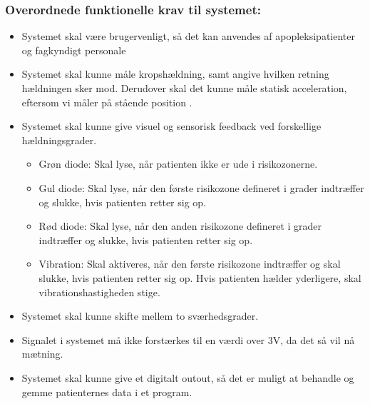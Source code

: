\subsubsection{Overordnede funktionelle krav til systemet:}
\begin{itemize}
\item Systemet skal være brugervenligt, så det kan anvendes af apopleksipatienter og fagkyndigt personale
\item Systemet skal kunne måle kropshældning, samt angive hvilken retning hældningen sker mod. Derudover skal det kunne måle statisk acceleration, eftersom vi måler på stående position .
\item Systemet skal kunne give visuel og sensorisk feedback ved forskellige hældningsgrader.
\begin{itemize}
\item Grøn diode: Skal lyse, når patienten ikke er ude i risikozonerne.  
\item Gul diode: Skal lyse, når den første risikozone defineret i grader indtræffer og slukke, hvis patienten retter sig op.
\item Rød diode: Skal lyse, når den anden risikozone defineret i grader indtræffer og slukke, hvis patienten retter sig op.
\item Vibration: Skal aktiveres, når den første risikozone indtræffer og skal slukke, hvis patienten retter sig op. Hvis patienten hælder yderligere, skal vibrationshastigheden stige.
\end{itemize}
\item Systemet skal kunne skifte mellem to sværhedsgrader.
\item Signalet i systemet må ikke forstærkes til en værdi over 3V, da det så vil nå mætning.
\item Systemet skal kunne give et digitalt outout, så det er muligt at behandle og gemme patienternes data i et program.
\end{itemize}



